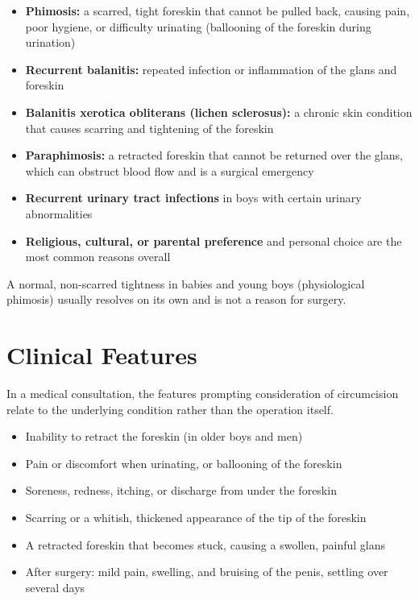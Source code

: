 \begin{itemize}
    \item \textbf{Phimosis:} a scarred, tight foreskin that cannot be pulled back, causing pain, poor hygiene, or difficulty urinating (ballooning of the foreskin during urination)
    \item \textbf{Recurrent balanitis:} repeated infection or inflammation of the glans and foreskin
    \item \textbf{Balanitis xerotica obliterans (lichen sclerosus):} a chronic skin condition that causes scarring and tightening of the foreskin
    \item \textbf{Paraphimosis:} a retracted foreskin that cannot be returned over the glans, which can obstruct blood flow and is a surgical emergency
    \item \textbf{Recurrent urinary tract infections} in boys with certain urinary abnormalities
    \item \textbf{Religious, cultural, or parental preference} and personal choice are the most common reasons overall
\end{itemize}

A normal, non-scarred tightness in babies and young boys (physiological phimosis) usually resolves on its own and is not a reason for surgery.

\section*{Clinical Features}
In a medical consultation, the features prompting consideration of circumcision relate to the underlying condition rather than the operation itself.

\begin{itemize}
    \item Inability to retract the foreskin (in older boys and men)
    \item Pain or discomfort when urinating, or ballooning of the foreskin
    \item Soreness, redness, itching, or discharge from under the foreskin
    \item Scarring or a whitish, thickened appearance of the tip of the foreskin
    \item A retracted foreskin that becomes stuck, causing a swollen, painful glans
    \item After surgery: mild pain, swelling, and bruising of the penis, settling over several days
\end{itemize}


